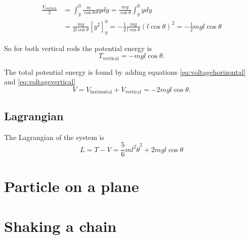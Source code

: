 \documentclass[11pt]{amsart}
\begin{document}
\begin{align*}
\frac{V_{\text{vertical}}}{2} &= \int_y^0\frac{m}{\cos\theta}gydy = \frac{mg}{\cos\theta}\int_y^0 ydy \\
&= \frac{mg}{2l\cos\theta}[y^2]_y^0 = -\frac{1}{2}\frac{mg}{l\cos\theta}(l\cos\theta)^2 = -\frac{1}{2}mgl\cos\theta
\end{align*}

So for both vertical rods the potential energy is 
\begin{equation}
T_{\text{vertical}} = -mgl\cos\theta.
\label{eq:voltagevertical}
\end{equation}

The total potential energy is found by adding equations \ref{eq:voltagehorizontal} and \ref{eq:voltagevertical}
\begin{equation}
V = V_{\text{horizontal}}+ V_{\text{vertical}} = -2mgl\cos\theta.
\end{equation}

\subsection{Lagrangian}
The Lagrangian of the system is
\begin{equation}
L = T - V = \frac{5}{6}ml^2\dot{\theta}^2 + 2mgl\cos\theta
\end{equation}


\section{Particle on a plane}


\section{Shaking a chain}
\end{document}
